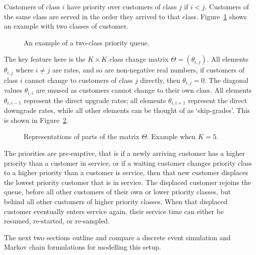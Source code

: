 \documentclass{article}
\begin{document}
Customers of class $i$ have priority over customers of class $j$ if $i < j$.
Customers of the same class are served in the order they arrived to that class.
Figure~\ref{fig:twoclass_example} shows an example with two classes of customer.

\begin{figure}
\begin{center}

\end{center}
\caption{An example of a two-class priority queue.}
\label{fig:twoclass_example}
\end{figure}

The key feature here is the $K \times K$ class change matrix
$\Theta = (\theta_{i,j})$. All elements $\theta_{i,j}$ where $i \neq j$ are
rates, and so are non-negative real numbers, if customers of class $i$ cannot
change to customers of class $j$ directly, then $\theta_{i,j} = 0$. The diagonal
values $\theta_{i,i}$ are unused as customers cannot change to their own class.
All elements $\theta_{i,i-1}$ represent the direct upgrade rates; all elements
$\theta_{i,i+1}$ represent the direct downgrade rates, while all other elements
can be thought of as `skip-grades'.
This is shown in Figure~\ref{fig:skipgrades}.

\begin{figure}
\begin{center}

\end{center}
\caption{Representations of parts of the matrix $\Theta$. Example when $K=5$.}
\label{fig:skipgrades}
\end{figure}

The priorities are pre-emptive, that is if a newly arriving customer has a
higher priority than a customer in service, or if a waiting customer changes
priority class to a higher priority than a customer is service, then that new
customer displaces the lowest priority customer that is in service. The
displaced customer rejoins the queue, before all other customers of their own or
lower priority classes, but behind all other customers of higher priority
classes. When that displaced customer eventually enters service again, their
service time can either be resumed, re-started, or re-sampled.

The next two sections outline and compare a discrete event simulation and
Markov chain formulations for modelling this setup.
\end{document}
